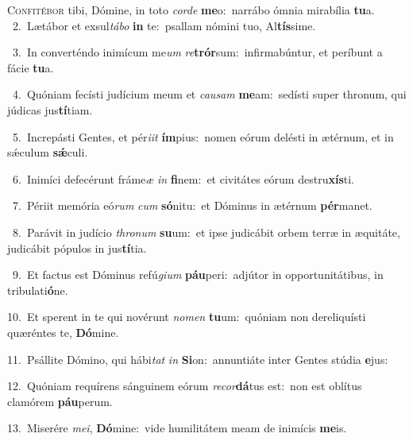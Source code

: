 \lettrine{\initial\textcolor{\initialcolor}{C}}{onfitébor} tibi, Dómine, in toto \textit{cor}\-\textit{de} \textbf{me}\-o:~\star narrábo ómnia mirabília \textbf{tu}\-a.\\
{\numbfont\textcolor{\numbcolor}{~2.}}~Lætábor et exsul\-\textit{tá}\-\textit{bo} \textbf{in} te:~\star psallam nómini tuo, Al\-\textbf{tís}\-sime.\par
{\numbfont\textcolor{\numbcolor}{~3.}}~In converténdo inimícum me\textit{um} \textit{re}\-\textbf{trór}sum:~\star infirmabúntur, et períbunt a fácie \textbf{tu}\-a.\par
{\numbfont\textcolor{\numbcolor}{~4.}}~Quóniam fecísti judícium meum et \textit{cau}\-\textit{sam} \textbf{me}\-am:~\star sedísti super thronum, qui júdicas jus\-\textbf{tí}\-tiam.\par
{\numbfont\textcolor{\numbcolor}{~5.}}~Increpásti Gentes, et pér\-\textit{i}\-\textit{it} \textbf{ím}\-pius:~\star nomen eórum delésti in ætérnum, et in sǽculum \textbf{sǽ}\-culi.\par
{\numbfont\textcolor{\numbcolor}{~6.}}~Inimíci defecérunt fráme\textit{æ} \textit{in} \textbf{fi}\-nem:~\star et civitátes eórum destru\-\textbf{xís}\-ti.\par
{\numbfont\textcolor{\numbcolor}{~7.}}~Périit memória eó\textit{rum} \textit{cum} \textbf{só}\-nitu:~\star et Dóminus in ætérnum \textbf{pér}\-manet.\par
{\numbfont\textcolor{\numbcolor}{~8.}}~Parávit in judício \textit{thro}\-\textit{num} \textbf{su}\-um:~\star et ipse judicábit orbem terræ in æquitáte, judicábit pópulos in jus\-\textbf{tí}\-tia.\par
{\numbfont\textcolor{\numbcolor}{~9.}}~Et factus est Dóminus refú\-\textit{gi}\-\textit{um} \textbf{páu}\-peri:~\star adjútor in opportunitátibus, in tribulati\-\textbf{ó}\-ne.\par
{\numbfont\textcolor{\numbcolor}{10.}}~Et sperent in te qui novérunt \textit{no}\-\textit{men} \textbf{tu}\-um:~\star quóniam non dereliquísti quæréntes te, \textbf{Dó}\-mine.\par
{\numbfont\textcolor{\numbcolor}{11.}}~Psállite Dómino, qui hábi\textit{tat} \textit{in} \textbf{Si}\-on:~\star annuntiáte inter Gentes stúdia \textbf{e}\-jus:\par
{\numbfont\textcolor{\numbcolor}{12.}}~Quóniam requírens sánguinem eórum \textit{re}\-\textit{cor}\textbf{dá}tus est:~\star non est oblítus clamórem \textbf{páu}\-perum.\par
{\numbfont\textcolor{\numbcolor}{13.}}~Miserére \textit{me}\-\textit{i}, \textbf{Dó}\-mine:~\star vide humilitátem meam de inimícis \textbf{me}\-is.\par
